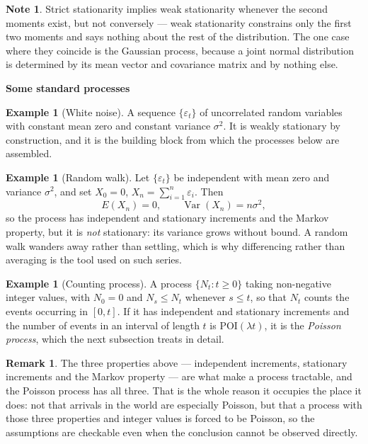 \documentclass[11pt,a4paper]{article}
\theoremstyle{definition}
\newtheorem{exa}[thm]{Example}
\newtheorem*{note}{Note}
\newtheorem*{remark}{Remark}
\newcommand{\subhead}[1]{%
  \par\medskip\noindent\textbf{#1}\par\nobreak\smallskip}
\DeclareMathOperator{\Var}{Var}
\begin{document}
\begin{note}
Strict stationarity implies weak stationarity whenever the second moments exist,
but not conversely --- weak stationarity constrains only the first two moments
and says nothing about the rest of the distribution. The one case where they
coincide is the Gaussian process, because a joint normal distribution is
determined by its mean vector and covariance matrix and by nothing else.
\end{note}

\subhead{Some standard processes}

\begin{exa}[White noise]
A sequence $\{\varepsilon_t\}$ of uncorrelated random variables with constant
mean zero and constant variance $\sigma^{2}$. It is weakly stationary by
construction, and it is the building block from which the processes below are
assembled.
\end{exa}

\begin{exa}[Random walk]
Let $\{\varepsilon_t\}$ be independent with mean zero and variance
$\sigma^{2}$, and set $X_0=0$, $X_n = \sum_{i=1}^{n}\varepsilon_i$. Then
$$E(X_n) = 0,\qquad \Var(X_n) = n\sigma^{2},$$
so the process has independent and stationary increments and the Markov
property, but it is \emph{not} stationary: its variance grows without bound. A
random walk wanders away rather than settling, which is why differencing rather
than averaging is the tool used on such series.
\end{exa}

\begin{exa}[Counting process]
A process $\{N_t : t\geq0\}$ taking non-negative integer values, with $N_0=0$
and $N_s\leq N_t$ whenever $s\leq t$, so that $N_t$ counts the events occurring
in $[0,t]$. If it has independent and stationary increments and the number of
events in an interval of length $t$ is POI$(\lambda t)$, it is the \emph{Poisson
process}, which the next subsection treats in detail.
\end{exa}

\begin{remark}
The three properties above --- independent increments, stationary increments and
the Markov property --- are what make a process tractable, and the Poisson
process has all three. That is the whole reason it occupies the place it does:
not that arrivals in the world are especially Poisson, but that a process with
those three properties and integer values is forced to be Poisson, so the
assumptions are checkable even when the conclusion cannot be observed directly.
\end{remark}
\end{document}
